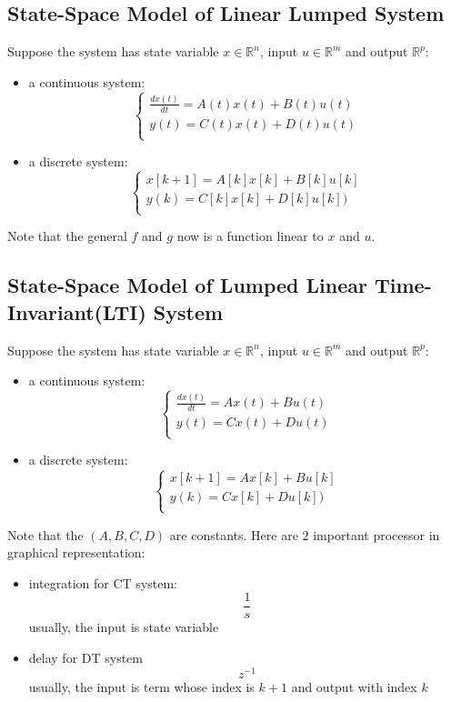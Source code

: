 \documentclass[10pt,a4paper,oneside]{article}
\begin{document}
\subsection{State-Space Model of Linear Lumped System}
Suppose the system has state variable $x \in \mathbb{R}^n$, input $u \in \mathbb{R}^m$ and output $\mathbb{R}^p$:
\begin{itemize}
	\item a continuous system:
	\[
	\left\{
	\begin{array}{ll}
	\frac{dx(t)}{dt} = A(t)x(t) + B(t)u(t)\\
	y(t) = C(t)x(t) + D(t)u(t)\\
	\end{array}\right.
	\]
	\item a discrete system:
	\[
	\left\{
	\begin{array}{ll}
	x[k+1] = A[k]x[k] + B[k]u[k]\\
	y(k) = C[k]x[k] + D[k]u[k])\\
	\end{array}\right.
	\]
\end{itemize}
Note that the general $f$ and $g$ now is a function linear to $x$ and $u$.

\subsection{State-Space Model of Lumped Linear Time-Invariant(LTI) System}
Suppose the system has state variable $x \in \mathbb{R}^n$, input $u \in \mathbb{R}^m$ and output $\mathbb{R}^p$:
\begin{itemize}
	\item a continuous system:
	\[
	\left\{
	\begin{array}{ll}
	\frac{dx(t)}{dt} = Ax(t) + Bu(t)\\
	y(t) = Cx(t) + Du(t)\\
	\end{array}\right.
	\]
	\item a discrete system:
	\[
	\left\{
	\begin{array}{ll}
	x[k+1] = Ax[k] + Bu[k]\\
	y(k) = Cx[k] + Du[k])\\
	\end{array}\right.
	\]
\end{itemize}
Note that the $(A, B, C, D)$ are constants. Here are $2$ important processor in graphical representation:
\begin{itemize}
	\item integration for CT system:
	\[
	\frac{1}{s}
	\]
	usually, the input is state variable
	\item delay for DT system
	\[
	z^{-1}
	\]
	usually, the input is term whose index is  $k+1$  and output with index $k$
\end{itemize}
\end{document}
